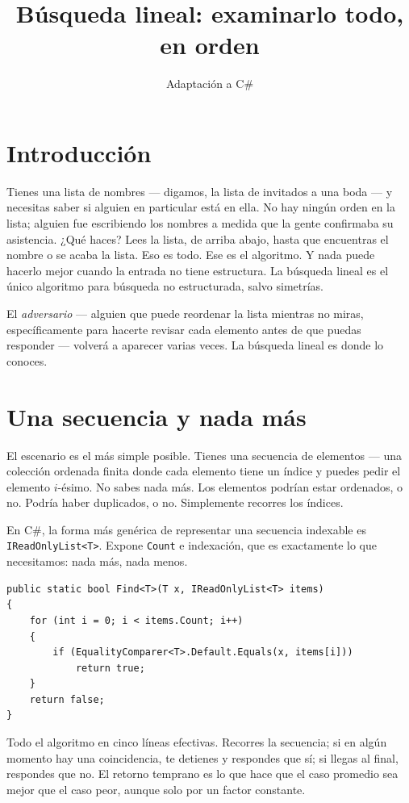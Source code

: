 \documentclass[11pt,a4paper]{article}
\title{Búsqueda lineal: examinarlo todo, en orden}
\author{Adaptación a C\#}
\date{}
\begin{document}
\maketitle

\section*{Introducción}

Tienes una lista de nombres --- digamos, la lista de invitados a una boda --- y necesitas saber si alguien en particular está en ella. No hay ningún orden en la lista; alguien fue escribiendo los nombres a medida que la gente confirmaba su asistencia. ¿Qué haces? Lees la lista, de arriba abajo, hasta que encuentras el nombre o se acaba la lista. Eso es todo. Ese es el algoritmo. Y nada puede hacerlo mejor cuando la entrada no tiene estructura. La búsqueda lineal es el único algoritmo para búsqueda no estructurada, salvo simetrías.

El \emph{adversario} --- alguien que puede reordenar la lista mientras no miras, específicamente para hacerte revisar cada elemento antes de que puedas responder --- volverá a aparecer varias veces. La búsqueda lineal es donde lo conoces.

\section{Una secuencia y nada más}

El escenario es el más simple posible. Tienes una secuencia de elementos --- una colección ordenada finita donde cada elemento tiene un índice y puedes pedir el elemento $i$-ésimo. No sabes nada más. Los elementos podrían estar ordenados, o no. Podría haber duplicados, o no. Simplemente recorres los índices.

En C\#, la forma más genérica de representar una secuencia indexable es \texttt{IReadOnlyList<T>}. Expone \texttt{Count} e indexación, que es exactamente lo que necesitamos: nada más, nada menos.

\begin{lstlisting}[caption={Búsqueda lineal: \texttt{Find}}]
public static bool Find<T>(T x, IReadOnlyList<T> items)
{
    for (int i = 0; i < items.Count; i++)
    {
        if (EqualityComparer<T>.Default.Equals(x, items[i]))
            return true;
    }
    return false;
}
\end{lstlisting}

Todo el algoritmo en cinco líneas efectivas. Recorres la secuencia; si en algún momento hay una coincidencia, te detienes y respondes que sí; si llegas al final, respondes que no. El retorno temprano es lo que hace que el caso promedio sea mejor que el caso peor, aunque solo por un factor constante.
\end{document}
